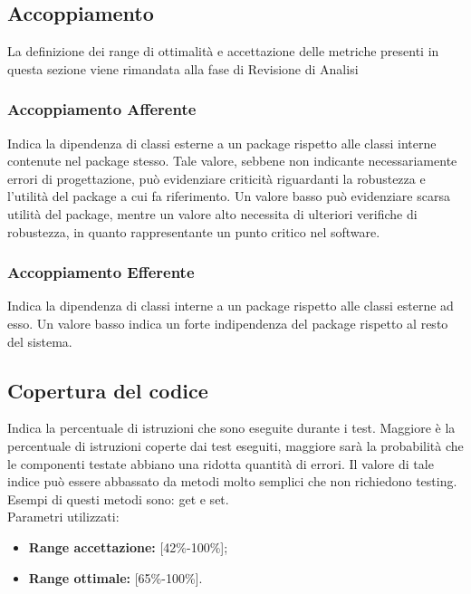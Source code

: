 \subsection{Accoppiamento}
La definizione dei range di ottimalità e accettazione delle metriche presenti in questa sezione viene rimandata alla fase di Revisione di Analisi
\subsubsection{Accoppiamento Afferente}
Indica la dipendenza di classi esterne a un package rispetto alle classi interne contenute nel package stesso.
Tale valore, sebbene non indicante necessariamente errori di progettazione, può evidenziare criticità riguardanti la robustezza e l'utilità del package a cui fa riferimento.
Un valore basso può evidenziare scarsa utilità del package, mentre un valore alto necessita di ulteriori verifiche di robustezza, in quanto rappresentante un punto critico nel software.
\subsubsection{Accoppiamento Efferente}
Indica la dipendenza di classi interne a un package rispetto alle classi esterne ad esso.
Un valore basso indica un forte indipendenza del package rispetto al resto del sistema.

\subsection{Copertura del codice}
Indica la percentuale di istruzioni che sono eseguite durante i test.
Maggiore è la percentuale di istruzioni coperte dai test eseguiti, maggiore sarà la probabilità che le componenti testate abbiano una ridotta quantità di errori.
Il valore di tale indice può essere abbassato da metodi molto semplici che non richiedono testing. Esempi di questi metodi sono: get e set.\\
Parametri utilizzati:

\begin{itemize}
	
	\item \textbf{Range accettazione:} [42\%-100\%];
	\item \textbf{Range ottimale:} [65\%-100\%].
	
\end{itemize}

